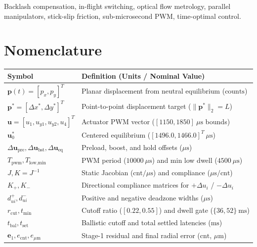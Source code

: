 \documentclass[journal]{IEEEtran}
\begin{document}
\begin{IEEEkeywords}
Backlash compensation, in-flight switching, optical flow metrology, parallel manipulators, stick-slip friction, sub-microsecond PWM, time-optimal control.
\end{IEEEkeywords}

\section*{Nomenclature}
\begin{table}[!h]
\centering
\renewcommand{\arraystretch}{1.15}
\begin{tabular}{@{}ll@{}}
\toprule
Symbol & Definition (Units / Nominal Value) \\
\midrule
$\mathbf{p}(t) = [p_x, p_y]^T$ & Planar displacement from neutral equilibrium ($\text{counts}$) \\
$\mathbf{p}^* = [\Delta x^*, \Delta y^*]^T$ & Point-to-point displacement target ($\|\mathbf{p}^*\|_2 = L$) \\
$\mathbf{u} = [u_1, u_{y1}, u_{y2}, u_4]^T$ & Actuator PWM vector ($[1150, 1850]\ \mu\text{s}$ bounds) \\
$\mathbf{u}_0^*$ & Centered equilibrium ($[1496.0, 1466.0]^T\ \mu\text{s}$) \\
$\Delta\mathbf{u}_{\text{pre}}, \Delta\mathbf{u}_{\text{bst}}, \Delta\mathbf{u}_{\text{eq}}$ & Preload, boost, and hold offsets ($\mu\text{s}$) \\
$T_{\text{pwm}}, T_{\text{low,min}}$ & PWM period ($10000\ \mu\text{s}$) and min low dwell ($4500\ \mu\text{s}$) \\
$J, K = J^{-1}$ & Static Jacobian ($\text{cnt}/\mu\text{s}$) and compliance ($\mu\text{s}/\text{cnt}$) \\
$K_+, K_-$ & Directional compliance matrices for $+\Delta u_i$ / $-\Delta u_i$ \\
$d_{ui}^+, d_{ui}^-$ & Positive and negative deadzone widths ($\mu\text{s}$) \\
$r_{\text{cut}}, t_{\min}$ & Cutoff ratio ($[0.22, 0.55]$) and dwell gate ($\{36, 52\}\ \text{ms}$) \\
$t_{\text{bal}}, t_{\text{set}}$ & Ballistic cutoff and total settled latencies ($\text{ms}$) \\
$\mathbf{e}_1, e_{\text{cnt}}, e_{\mu\text{m}}$ & Stage-1 residual and final radial error ($\text{cnt}$, $\mu\text{m}$) \\
\bottomrule
\end{tabular}
\end{table}
\end{document}

